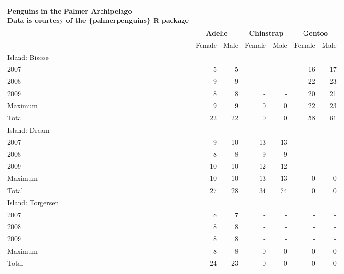 \begin{longtable}{l|rrrrrr}
\caption*{
{\large Penguins in the Palmer Archipelago} \\ 
{\small Data is courtesy of the \{palmerpenguins\} R package}
} \\ 
\toprule
\multicolumn{1}{l}{} & \multicolumn{2}{c}{\textbf{Adelie}} & \multicolumn{2}{c}{\textbf{Chinstrap}} & \multicolumn{2}{c}{\textbf{Gentoo}} \\ 
\cmidrule(lr){2-3} \cmidrule(lr){4-5} \cmidrule(lr){6-7}
\multicolumn{1}{l}{} & Female & Male & Female & Male & Female & Male \\ 
\midrule
\multicolumn{7}{l}{Island: Biscoe} \\ 
\midrule
2007 & 5 & 5 & - & - & 16 & 17 \\ 
2008 & 9 & 9 & - & - & 22 & 23 \\ 
2009 & 8 & 8 & - & - & 20 & 21 \\ 
\midrule 
Maximum & $9$ & $9$ & $0$ & $0$ & $22$ & $23$ \\ 
Total & $22$ & $22$ & $0$ & $0$ & $58$ & $61$ \\ 
\midrule
\multicolumn{7}{l}{Island: Dream} \\ 
\midrule
2007 & 9 & 10 & 13 & 13 & - & - \\ 
2008 & 8 & 8 & 9 & 9 & - & - \\ 
2009 & 10 & 10 & 12 & 12 & - & - \\ 
\midrule 
Maximum & $10$ & $10$ & $13$ & $13$ & $0$ & $0$ \\ 
Total & $27$ & $28$ & $34$ & $34$ & $0$ & $0$ \\ 
\midrule
\multicolumn{7}{l}{Island: Torgersen} \\ 
\midrule
2007 & 8 & 7 & - & - & - & - \\ 
2008 & 8 & 8 & - & - & - & - \\ 
2009 & 8 & 8 & - & - & - & - \\ 
\midrule 
Maximum & $8$ & $8$ & $0$ & $0$ & $0$ & $0$ \\ 
Total & $24$ & $23$ & $0$ & $0$ & $0$ & $0$ \\ 
\bottomrule
\end{longtable}


